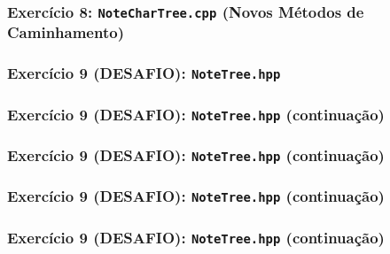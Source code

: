 \documentclass[aspectratio=169]{beamer}
\begin{document}
\begin{frame}[fragile]\frametitle{Exercício 8: \texttt{NoteCharTree.cpp} (Novos Métodos de Caminhamento)}

\end{frame}

\begin{frame}[fragile]\frametitle{Exercício 9 (DESAFIO): \texttt{NoteTree.hpp}}
\fontsize{3pt}{5pt}\selectfont{

}
\end{frame}

\begin{frame}[fragile]\frametitle{Exercício 9 (DESAFIO): \texttt{NoteTree.hpp} (continuação)}
\fontsize{3pt}{5pt}\selectfont{

}
\end{frame}

\begin{frame}[fragile]\frametitle{Exercício 9 (DESAFIO): \texttt{NoteTree.hpp} (continuação)}
\fontsize{3pt}{5pt}\selectfont{

}
\end{frame}

\begin{frame}[fragile]\frametitle{Exercício 9 (DESAFIO): \texttt{NoteTree.hpp} (continuação)}
\fontsize{3pt}{5pt}\selectfont{

}
\end{frame}

\begin{frame}[fragile]\frametitle{Exercício 9 (DESAFIO): \texttt{NoteTree.hpp} (continuação)}
\fontsize{3pt}{5pt}\selectfont{

}
\end{frame}
\end{document}
